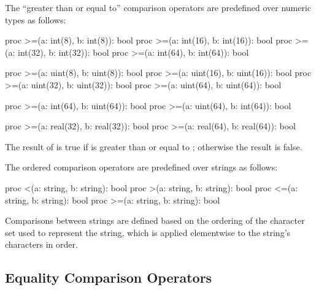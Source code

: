 The ``greater than or equal to'' comparison operators are predefined
over numeric types as follows:
\begin{chapel}
proc >=(a: int(8), b: int(8)): bool
proc >=(a: int(16), b: int(16)): bool
proc >=(a: int(32), b: int(32)): bool
proc >=(a: int(64), b: int(64)): bool

proc >=(a: uint(8), b: uint(8)): bool
proc >=(a: uint(16), b: uint(16)): bool
proc >=(a: uint(32), b: uint(32)): bool
proc >=(a: uint(64), b: uint(64)): bool

proc >=(a: int(64), b: uint(64)): bool
proc >=(a: uint(64), b: int(64)): bool

proc >=(a: real(32), b: real(32)): bool
proc >=(a: real(64), b: real(64)): bool
\end{chapel}
The result of  is true if  is greater than or
equal to ; otherwise the result is false.

The ordered comparison operators are predefined over strings as follows:
\begin{chapel}
proc <(a: string, b: string): bool
proc >(a: string, b: string): bool
proc <=(a: string, b: string): bool
proc >=(a: string, b: string): bool
\end{chapel}
Comparisons between strings are defined based on the ordering of the
character set used to represent the string, which is applied
elementwise to the string's characters in order.


\subsection{Equality Comparison Operators}
\label{Equality_Comparison_Operators}

